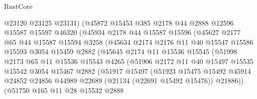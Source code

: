 \begin{lexlean}{RustCore}
\begin{coremodule}
                    @23120
                    @23125
                    @23131)
                  (@45872
                    @15453
                    @385
                    @2178
                    @44
                    @2888
                    @12596
                    @15587
                    @15597
                    @46320
                    (@45934
                      @2178
                      @44
                      @15587
                      @15596
                      (@45627
                        @2177
                        @65
                        @44
                        @15587
                        @15594
                        @3258
                        (@45634
                          @2174
                          @2176
                          @11
                          @40
                          @15547
                          @15586
                          @15593
                          @3054
                          @15459
                          @2882
                          (@45645
                            @2174
                            @11
                            @15536
                            @15545
                            (@51998
                              @2173
                              @65
                              @11
                              @15536
                              @15543
                              @4265
                              (@51906
                                @2172
                                @11
                                @40
                                @15497
                                @15535
                                @15542
                                @3054
                                @15467
                                @2882
                                (@51917
                                  @15497
                                  (@51923
                                    @15475
                                    @15492
                                    @45914
                                    @24852
                                    @24856
                                    @44989
                                    @22689
                                    (@21134 (@22691 @15492 @15476))
                                    @21886))
                                (@51750
                                  @165
                                  @11
                                  @28
                                  @15532
                                  @2888

\end{coremodule}
\end{lexlean}

